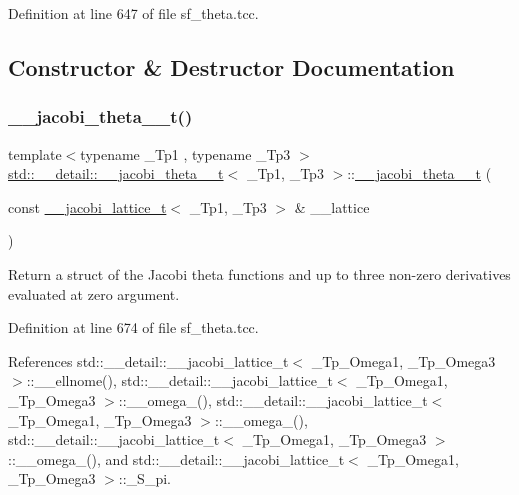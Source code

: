Definition at line 647 of file sf\+\_\+theta.\+tcc.



\subsection{Constructor \& Destructor Documentation}
\mbox{\label{structstd_1_1____detail_1_1____jacobi__theta__0__t_ab93acbb79590d3d0bf8f28ae018be613}} 
\subsubsection{\texorpdfstring{\+\_\+\+\_\+jacobi\+\_\+theta\+\_\+\_\+t()}{\_\_jacobi\_theta\_0\_t()}}
{\footnotesize\ttfamily template$<$typename \+\_\+\+Tp1 , typename \+\_\+\+Tp3 $>$ \\
\hyperlink{structstd_1_1____detail_1_1____jacobi__theta__0__t}{std\+::\+\_\+\+\_\+detail\+::\+\_\+\+\_\+jacobi\+\_\+theta\+\_\+\_\+t}$<$ \+\_\+\+Tp1, \+\_\+\+Tp3 $>$\+::\hyperlink{structstd_1_1____detail_1_1____jacobi__theta__0__t}{\+\_\+\+\_\+jacobi\+\_\+theta\+\_\+\_\+t} (\begin{DoxyParamCaption}\item[{const \hyperlink{structstd_1_1____detail_1_1____jacobi__lattice__t}{\+\_\+\+\_\+jacobi\+\_\+lattice\+\_\+t}$<$ \+\_\+\+Tp1, \+\_\+\+Tp3 $>$ \&}]{\+\_\+\+\_\+lattice }\end{DoxyParamCaption})}

Return a struct of the Jacobi theta functions and up to three non-\/zero derivatives evaluated at zero argument. 

Definition at line 674 of file sf\+\_\+theta.\+tcc.



References std\+::\+\_\+\+\_\+detail\+::\+\_\+\+\_\+jacobi\+\_\+lattice\+\_\+t$<$ \+\_\+\+Tp\+\_\+\+Omega1, \+\_\+\+Tp\+\_\+\+Omega3 $>$\+::\+\_\+\+\_\+ellnome(), std\+::\+\_\+\+\_\+detail\+::\+\_\+\+\_\+jacobi\+\_\+lattice\+\_\+t$<$ \+\_\+\+Tp\+\_\+\+Omega1, \+\_\+\+Tp\+\_\+\+Omega3 $>$\+::\+\_\+\+\_\+omega\+\_(), std\+::\+\_\+\+\_\+detail\+::\+\_\+\+\_\+jacobi\+\_\+lattice\+\_\+t$<$ \+\_\+\+Tp\+\_\+\+Omega1, \+\_\+\+Tp\+\_\+\+Omega3 $>$\+::\+\_\+\+\_\+omega\+\_(), std\+::\+\_\+\+\_\+detail\+::\+\_\+\+\_\+jacobi\+\_\+lattice\+\_\+t$<$ \+\_\+\+Tp\+\_\+\+Omega1, \+\_\+\+Tp\+\_\+\+Omega3 $>$\+::\+\_\+\+\_\+omega\+\_(), and std\+::\+\_\+\+\_\+detail\+::\+\_\+\+\_\+jacobi\+\_\+lattice\+\_\+t$<$ \+\_\+\+Tp\+\_\+\+Omega1, \+\_\+\+Tp\+\_\+\+Omega3 $>$\+::\+\_\+\+S\+\_\+pi.



